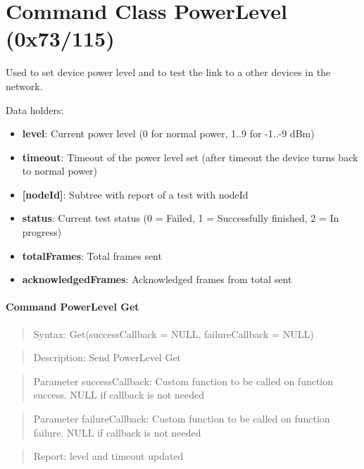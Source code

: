 \section{Command Class PowerLevel (0x73/115)}

Used to set device power level and to test the link to a other devices in the network.
\newline

\noindent
Data holders:

\begin{itemize}
\item \textbf{level}: Current power level (0 for normal power, 1..9 for -1..-9 dBm)
\item \textbf{timeout}: Timeout of the power level set (after timeout the device turns back to normal power)
\item \textbf{[nodeId]}: Subtree with report of a test with nodeId
\item \qquad\textbf{status}: Current test status (0 = Failed, 1 = Successfully finished, 2 = In progress)
\item \qquad\textbf{totalFrames}: Total frames sent
\item \qquad\textbf{acknowledgedFrames}: Acknowledged frames from total sent
\end{itemize}

\paragraph{Command PowerLevel Get}
\begin{quote}Syntax: Get(successCallback = NULL, failureCallback = NULL)\end{quote}
\begin{quote}Description: Send PowerLevel Get\end{quote}
\begin{quote}Parameter successCallback: Custom function to be called on function success. NULL if callback is not needed\end{quote}
\begin{quote}Parameter failureCallback: Custom function to be called on function failure. NULL if callback is not needed\end{quote}
\begin{quote}Report: level and timeout updated\end{quote}

